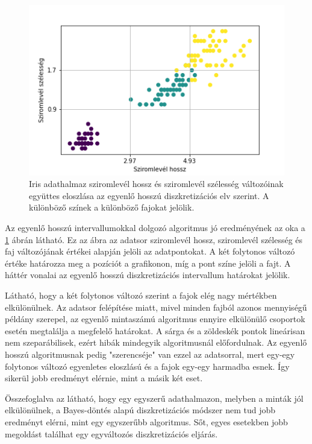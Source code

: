 \begin{figure}[htp]\centering
    \includegraphics[width=12cm]{figures/IrisEloszlas.png}
    \caption{Iris adathalmaz sziromlevél hossz és sziromlevél szélesség változóinak együttes eloszlása az egyenlő hosszú diszkretizációs elv szerint. A különböző színek a különböző fajokat jelölik.}
    \label{fig:iris-eloszlas}
\end{figure}

Az egyenlő hosszú intervallumokkal dolgozó algoritmus jó eredményének az oka a \ref{fig:iris-eloszlas} ábrán látható. Ez az ábra az adatsor sziromlevél hossz, sziromlevél szélesség és faj változójának értékei alapján jelöli az adatpontokat. A két folytonos változó értéke határozza meg a pozíciót a grafikonon, míg a pont színe jelöli a fajt. A háttér vonalai az egyenlő hosszú diszkretizációs intervallum határokat jelölik.

Látható, hogy a két folytonos változó szerint a fajok elég nagy mértékben elkülönülnek. Az adatsor felépítése miatt, mivel minden fajból azonos mennyiségű példány szerepel, az egyenlő mintaszámú algoritmus ennyire elkülönülő csoportok esetén megtalálja a megfelelő határokat. A sárga és a zöldeskék pontok lineárisan nem szeparábilisek, ezért hibák mindegyik algoritmusnál előfordulnak. Az egyenlő hosszú algoritmusnak pedig "szerencséje" van ezzel az adatsorral, mert egy-egy folytonos változó egyenletes eloszlású és a fajok egy-egy harmadba esnek. Így sikerül jobb eredményt elérnie, mint a másik két eset.

Összefoglalva az látható, hogy egy egyszerű adathalmazon, melyben a minták jól elkülönülnek, a Bayes-döntés alapú diszkretizációs módszer nem tud jobb eredményt elérni, mint egy egyszerűbb algoritmus. Sőt, egyes esetekben jobb megoldást találhat egy egyváltozós diszkretizációs eljárás.

